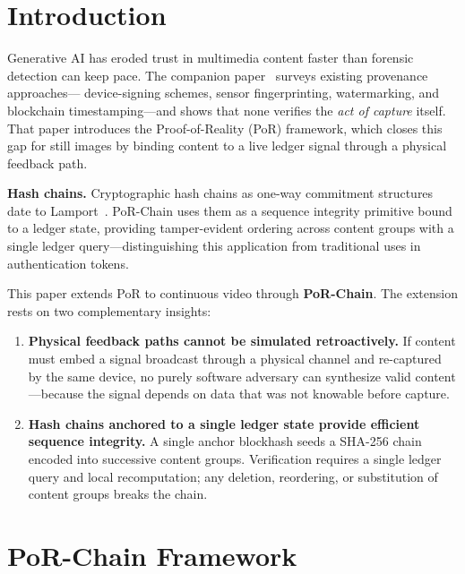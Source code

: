 \documentclass[11pt]{article}
\begin{document}
\section{Introduction}

Generative AI has eroded trust in multimedia content faster than forensic detection
can keep pace. The companion paper~\cite{por} surveys existing provenance approaches---
device-signing schemes, sensor fingerprinting, watermarking, and blockchain
timestamping---and shows that none verifies the \emph{act of capture} itself.
That paper introduces the Proof-of-Reality (PoR) framework, which closes this gap
for still images by binding content to a live ledger signal through a physical
feedback path.

\textbf{Hash chains.} Cryptographic hash chains as one-way commitment structures
date to Lamport~\cite{lamport}. PoR-Chain uses them as a sequence integrity
primitive bound to a ledger state, providing tamper-evident ordering across content
groups with a single ledger query---distinguishing this application from traditional
uses in authentication tokens.

This paper extends PoR to continuous video through \textbf{PoR-Chain}. The
extension rests on two complementary insights:

\begin{enumerate}
\item \textbf{Physical feedback paths cannot be simulated retroactively.} If content
  must embed a signal broadcast through a physical channel and re-captured by the
  same device, no purely software adversary can synthesize valid content---because
  the signal depends on data that was not knowable before capture.

\item \textbf{Hash chains anchored to a single ledger state provide efficient
  sequence integrity.} A single anchor blockhash seeds a SHA-256 chain encoded into
  successive content groups. Verification requires a single ledger query and local
  recomputation; any deletion, reordering, or substitution of content groups breaks
  the chain.
\end{enumerate}

\section{PoR-Chain Framework}
\label{sec:framework}
\end{document}
